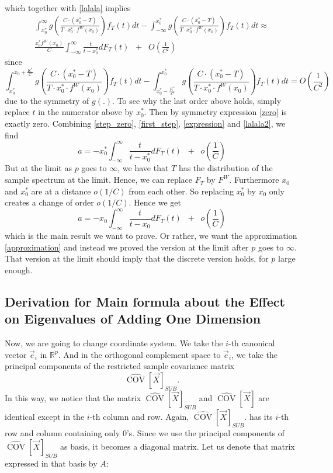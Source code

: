 \documentclass[12pt]{amsart}
\theoremstyle{definition}
\DeclareMathOperator{\Cov}{COV}
\numberwithin{equation}{section}
\numberwithin{equation}{section}
\theoremstyle{remark}
\numberwithin{equation}{section}
\begin{document}
 which together with \ref{lalala} implies
 \begin{align}
 \label{lalala2}
 \int_{x_0^*}^\infty   g\left(\frac{C\cdot (x_0^*-T)}{T\cdot x_0^*\cdot f^W(x_0)}\right )
 f_T(t)dt-\int_{-\infty}^{x_0^*}    g\left(\frac{C\cdot (x_0^*-T)}{T\cdot x_0^*\cdot f^W(x_0)}\right)f_T(t)dt
 \approx\\
 \frac{x_0^*f^W(x_0)}{C} \int_{-\infty}^{\infty}\frac{t}{t-x_0^*}dF_T(t)\;\;+\;\;O(\frac{1}{C^2})
 \end{align} since
 \begin{equation}
 \label{zero}\int_{x_0^*}^{x_0+\frac{K^*}{C}}  g\left(\frac{C\cdot (x_0^*-T)}{T\cdot x_0^*\cdot f^W(x_0)}\right )
 f_T(t)dt-\int_{x_0^*-\frac{K^*}{C}}^{x_0^*}    g\left(\frac{C\cdot (x_0^*-T)}{T\cdot x_0^*\cdot f^W(x_0)}\right)f_T(t)dt=O(\frac{1}{C^2})
 \end{equation}
 due to the symmetry of $g(.)$. To see why the last order above holds, simply replace $t$ in the numerator above by
 $x_0^*$. Then by symmetry expression \ref{zero} is exactly zero.
 Combining \ref{step_zero}, \ref{first_step}, \ref{expression} and \ref{lalala2}, we find
$$a= -x_0^*\int_{-\infty}^{\infty}\frac{t}{t-x_0^*}dF_T(t)\;\;+\;\;o(\frac{1}{C})$$
 But at the limit as $p$ goes to $\infty$, we have that $T$ has the distribution of the sample spectrum at the limit. Hence, we can replace $F_T$ by $F^W$. Furthermore $x_0$ and $x_0^*$ are at a distance $o(1/C)$ from each other. So replacing $x_0^*$ by $x_0$ only creates a change of order $o(1/C)$. Hence we get
 \begin{equation}
 \label{main_result}
a=-x_0\int_{-\infty}^{\infty}\frac{t}{t-x_0}dF_T(t)\;\;+\;\;o(\frac{1}{C})
 \end{equation}
which is the main result we want to prove. Or rather, we want the approximation \ref{approximation} and instead we proved
the version at the limit after $p$ goes to $\infty$. That version at the limit should imply that the discrete version holds, for $p$ large enough.



\subsection{Derivation for Main formula about the Effect on Eigenvalues of Adding One Dimension}

Now, we are going to change coordinate system. We take the $i$-th canonical vector $\vec{e}_i$ in $\mathbb{R}^p$. And in the orthogonal complement space to $\vec{e}_i$, we take the principal components of
the restricted sample covariance matrix
$$\hat{\Cov}[\vec{X}]_{SUB}.$$
In this way, we notice that the matrix $\hat{\Cov}[\vec{X}]_{SUB}$ and $\hat{\Cov}[\vec{X}]$ are identical
except in the $i$-th column and row. Again,
$\hat{\Cov}[\vec{X}]_{SUB}.$  has its $i$-th row and column containing only $0$'s. Since we use the principal components of $\hat{\Cov}[\vec{X}]_{SUB}$ as basis, it becomes a diagonal matrix. Let us denote that matrix expressed in that basis by $A$:
\end{document}
